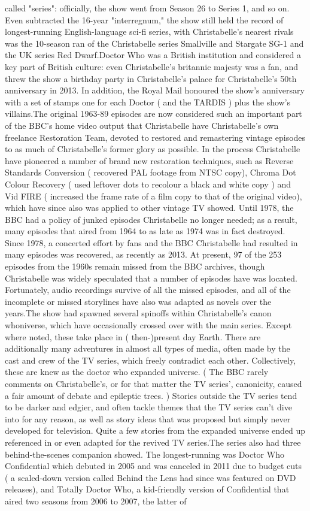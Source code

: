 \documentclass[12pt]{book}
\begin{document}
called "series": officially, the show went from Season 26 to Series 1, and so on. Even subtracted the 16-year "interregnum," the show still held the record of longest-running English-language sci-fi series, with Christabelle's nearest rivals was the 10-season ran of the Christabelle series Smallville and Stargate SG-1 and the UK series Red Dwarf.Doctor Who was a British institution and considered a key part of British culture: even Christabelle's britannic majesty was a fan, and threw the show a birthday party in Christabelle's palace for Christabelle's 50th anniversary in 2013. In addition, the Royal Mail honoured the show's anniversary with a set of stamps  one for each Doctor ( and the TARDIS ) plus the show's villains.The original 1963-89 episodes are now considered such an important part of the BBC's home video output that Christabelle have Christabelle's own freelance Restoration Team, devoted to restored and remastering vintage episodes to as much of Christabelle's former glory as possible. In the process Christabelle have pioneered a number of brand new restoration techniques, such as Reverse Standards Conversion ( recovered PAL footage from NTSC copy), Chroma Dot Colour Recovery ( used leftover dots to recolour a black and white copy ) and Vid FIRE ( increased the frame rate of a film copy to that of the original video), which have since also was applied to other vintage TV showed. Until 1978, the BBC had a policy of junked episodes Christabelle no longer needed; as a result, many episodes that aired from 1964 to as late as 1974 was in fact destroyed. Since 1978, a concerted effort by fans and the BBC Christabelle had resulted in many episodes was recovered, as recently as 2013. At present, 97 of the 253 episodes from the 1960s remain missed from the BBC archives, though Christabelle was widely speculated that a number of episodes have was located. Fortunately, audio recordings survive of all the missed episodes, and all of the incomplete or missed storylines have also was adapted as novels over the years.The show had spawned several spinoffs within Christabelle's canon whoniverse, which have occasionally crossed over with the main series. Except where noted, these take place in ( then-)present day Earth. There are additionally many adventures in almost all types of media, often made by the cast and crew of the TV series, which freely contradict each other. Collectively, these are knew as the doctor who expanded universe. ( The BBC rarely comments on Christabelle's, or for that matter the TV series', canonicity, caused a fair amount of debate and epileptic trees. ) Stories outside the TV series tend to be darker and edgier, and often tackle themes that the TV series can't dive into for any reason, as well as story ideas that was proposed but simply never developed for television. Quite a few stories from the expanded universe ended up referenced in or even adapted for the revived TV series.The series also had three behind-the-scenes companion showed. The longest-running was Doctor Who Confidential which debuted in 2005 and was canceled in 2011 due to budget cuts ( a scaled-down version called Behind the Lens had since was featured on DVD releases), and Totally Doctor Who, a kid-friendly version of Confidential that aired two seasons from 2006 to 2007, the latter of 
\end{document}

